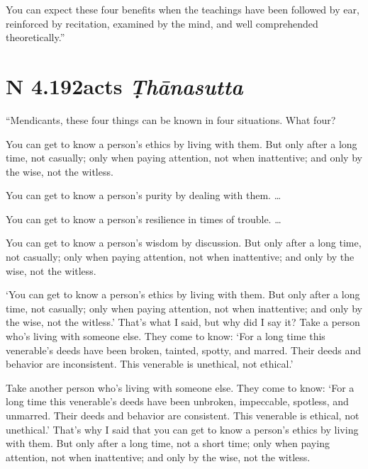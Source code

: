 \documentclass[12pt,openany]{book}%
\newcommand*{\suttatitleacronym}[1]{\smaller[2]{#1}\vspace*{.3em}}
\newcommand*{\suttatitletranslation}[1]{\linebreak{#1}}
\newcommand*{\suttatitleroot}[1]{\linebreak\smaller[2]\itshape{#1}}
\newcommand*{\tocacronym}[1]{\hspace*{-3.3em}{#1}\quad}
\newcommand*{\toctranslation}[1]{#1}
\newcommand*{\tocroot}[1]{(\textit{#1})}
\begin{document}
You can expect these four benefits when the teachings have been followed by ear, reinforced by recitation, examined by the mind, and well comprehended theoretically.” 

%
\section*{{\suttatitleacronym AN 4.192}{\suttatitletranslation Facts }{\suttatitleroot Ṭhānasutta}}
\addcontentsline{toc}{section}{\tocacronym{AN 4.192} \toctranslation{Facts } \tocroot{Ṭhānasutta}}

“Mendicants, these four things can be known in four situations. What four? 

You can get to know a person’s ethics by living with them. But only after a long time, not casually; only when paying attention, not when inattentive; and only by the wise, not the witless. 

You can get to know a person’s purity by dealing with them. … 

You can get to know a person’s resilience in times of trouble. … 

You can get to know a person’s wisdom by discussion. But only after a long time, not casually; only when paying attention, not when inattentive; and only by the wise, not the witless. 

‘You can get to know a person’s ethics by living with them. But only after a long time, not casually; only when paying attention, not when inattentive; and only by the wise, not the witless.’ That’s what I said, but why did I say it? Take a person who’s living with someone else. They come to know: ‘For a long time this venerable’s deeds have been broken, tainted, spotty, and marred. Their deeds and behavior are inconsistent. This venerable is unethical, not ethical.’ 

Take another person who’s living with someone else. They come to know: ‘For a long time this venerable’s deeds have been unbroken, impeccable, spotless, and unmarred. Their deeds and behavior are consistent. This venerable is ethical, not unethical.’ That’s why I said that you can get to know a person’s ethics by living with them. But only after a long time, not a short time; only when paying attention, not when inattentive; and only by the wise, not the witless. 
\end{document}
